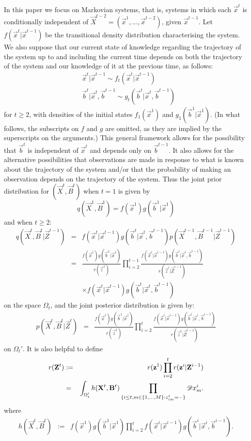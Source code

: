 In this paper we focus on Markovian systems, that is, systems in which each $\vec{x}^t$ is conditionally independent of $\vec{X}^{t-2} = (\vec{x}^1, \ldots,\vec{x}^{t-2})$, given $\vec{x}^{t-1}$. Let $f(\vec{x}^t | \vec{x}^{t-1})$ be the transitional density distribution characterising the system. We also suppose that our current state of knowledge regarding the trajectory of the system up to and including the current time depends on both the trajectory of the system and our knowledge of it at the previous time, as follows:
\begin{align*}
    &\vec{x}^t | \vec{x}^{t-1} \sim f_t(\vec{x}^t | \vec{x}^{t-1})\\
    &\vec{b}^t | \vec{x}^t, \vec{b}^{t-1} \sim g_t(\vec{b}^t | \vec{x}^t, \vec{b}^{t-1})
\end{align*}
for $t \geq 2$, with densities of the initial states $f_1(\vec{x}^1)$ and $g_1(\vec{b}^1 | \vec{x}^1)$. (In what follows, the subscripts on $f$ and $g$ are omitted, as they are implied by the superscripts on the arguments.)
This general framework allows for the possibility that $\vec{b}^t$ is independent of $\vec{x}^{t}$ and depends only on $\vec{b}^{t-1}$. It also allows for the alternative possibilities that observations are made in response to what is known about the trajectory of the system and/or that the probability of making an observation depends on the trajectory of the system. Thus the joint prior distribution for $(\vec{X}^t,\vec{B}^t)$ when $t=1$ is given by 
\[
q(\vec{X}^1,\vec{B}^1) = f(\vec{x}^1)g(\vec{b}^1 | \vec{x}^1)
\]
and when $t \geq 2$: 
\begin{eqnarray*}
    q(\vec{X}^t, \vec{B}^t | \vec{Z}^{t-1}) &=& f(\vec{x}^t | \vec{x}^{t-1}) g(\vec{b}^t | \vec{x}^t, \vec{b}^{t-1}) p(\vec{X}^{t-1}, \vec{B}^{t-1} | \vec{Z}^{t-1}) \\
& = & \frac{f(\vec{x}^1)g(\vec{b}^1 | \vec{x}^1)}{r(\vec{z}^1)} \prod_{i=2}^{t-1} \frac{f(\vec{x}^i | \vec{x}^{i-1}) g(\vec{b}^i | \vec{x}^i, \vec{b}^{i-1})}{r(\vec{z}^i | \vec{Z}^{i-1})} \\
& & \times f(\vec{x}^t | \vec{x}^{t-1}) g(\vec{b}^t | \vec{x}^t, \vec{b}^{t-1})
\end{eqnarray*}
on the space $\Omega_t$, and the joint posterior distribution is given by:
\begin{eqnarray*}
    p(\vec{X}^t, \vec{B}^t | \vec{Z}^t) 
& = & \frac{f(\vec{x}^1)g(\vec{b}^1 | \vec{x}^1)}{r(\vec{z}^1)} \prod_{i=2}^t \frac{f(\vec{x}^i | \vec{x}^{i-1}) g(\vec{b}^i | \vec{x}^i , \vec{b}^{i-1})}{r(\vec{z}^t | \vec{Z}^{t-1})} 
\end{eqnarray*}
on $\Omega_t'$. It is also helpful to define
\begin{eqnarray*}
r(\mathbf{Z}^t) & := & r(\mathbf{z}^1) \prod_{i=2}^{t} r(\mathbf{z}^i | \mathbf{Z}^{i-1}) \\
& = & \int_{\Omega_t'}  h(\mathbf{X}^t,\mathbf{B}^t) \prod_{ \{ i \leq t, m \in \{1, \ldots, M \} : z^t_{im} = - \} } \mathscr{D} x^i_m.
\end{eqnarray*}
where
\begin{eqnarray*}
h(\vec{X}^t,\vec{B}^t) & := & f(\vec{x}^1)g(\vec{b}^1 | \vec{x}^1) \prod_{i=2}^{t} f(\vec{x}^i | \vec{x}^{i-1}) g(\vec{b}^i | \vec{x}^i , \vec{b}^{i-1}).
\end{eqnarray*}

